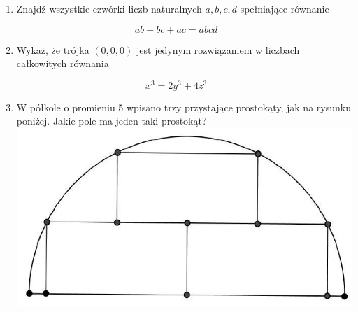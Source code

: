 \documentclass[10pt]{article}
\begin{document}
\begin{enumerate}
  \item Znajdź wszystkie czwórki liczb naturalnych \(a, b, c, d\) spełniające równanie
\end{enumerate}

\[
a b+b c+a c=a b c d
\]

\begin{enumerate}
  \setcounter{enumi}{1}
  \item Wykaż, że trójka \((0,0,0)\) jest jedynym rozwiązaniem w liczbach całkowitych równania
\end{enumerate}

\[
x^{3}=2 y^{3}+4 z^{3}
\]

\begin{enumerate}
  \setcounter{enumi}{2}
  \item W półkole o promieniu 5 wpisano trzy przystające prostokąty, jak na rysunku poniżej. Jakie pole ma jeden taki prostokąt?\\
\includegraphics[max width=\textwidth, center]{2024_11_21_9a8810d60a17513d82e4g-1}
\end{enumerate}
\end{document}
